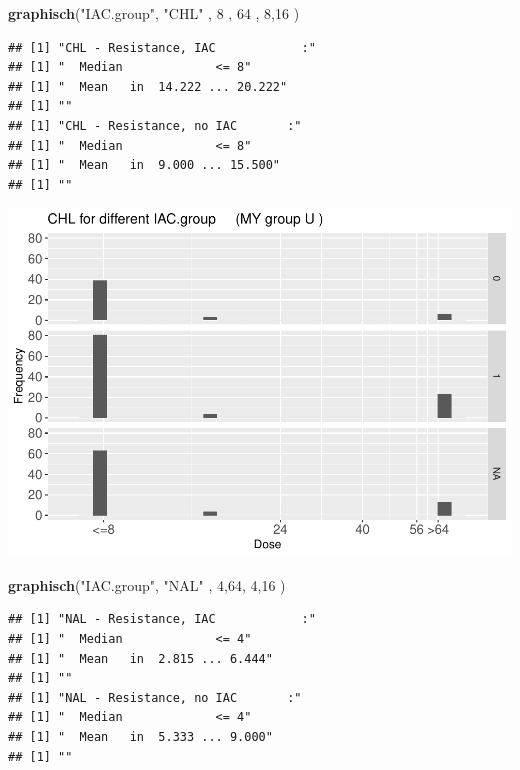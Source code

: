 \documentclass[
]{article}
\newenvironment{Shaded}{\begin{snugshade}}{\end{snugshade}}
\newcommand{\DecValTok}[1]{\textcolor[rgb]{0.00,0.00,0.81}{#1}}
\newcommand{\KeywordTok}[1]{\textcolor[rgb]{0.13,0.29,0.53}{\textbf{#1}}}
\newcommand{\NormalTok}[1]{#1}
\newcommand{\StringTok}[1]{\textcolor[rgb]{0.31,0.60,0.02}{#1}}
\begin{document}
\begin{Shaded}
\begin{Highlighting}[]
   \KeywordTok{graphisch}\NormalTok{(}\StringTok{"IAC.group"}\NormalTok{, }\StringTok{"CHL"}\NormalTok{ , }\DecValTok{8}\NormalTok{    ,  }\DecValTok{64}\NormalTok{   ,   }\DecValTok{8}\NormalTok{,}\DecValTok{16}\NormalTok{   ) }
\end{Highlighting}
\end{Shaded}

\begin{verbatim}
## [1] "CHL - Resistance, IAC            :"
## [1] "  Median             <= 8"
## [1] "  Mean   in  14.222 ... 20.222"
## [1] ""
## [1] "CHL - Resistance, no IAC       :"
## [1] "  Median             <= 8"
## [1] "  Mean   in  9.000 ... 15.500"
## [1] ""
\end{verbatim}

\includegraphics{Verteilungen_files/figure-latex/unnamed-chunk-13-1.pdf}

\begin{Shaded}
\begin{Highlighting}[]
   \KeywordTok{graphisch}\NormalTok{(}\StringTok{"IAC.group"}\NormalTok{, }\StringTok{"NAL"}\NormalTok{ , }\DecValTok{4}\NormalTok{,}\DecValTok{64}\NormalTok{,   }\DecValTok{4}\NormalTok{,}\DecValTok{16}\NormalTok{    ) }
\end{Highlighting}
\end{Shaded}

\begin{verbatim}
## [1] "NAL - Resistance, IAC            :"
## [1] "  Median             <= 4"
## [1] "  Mean   in  2.815 ... 6.444"
## [1] ""
## [1] "NAL - Resistance, no IAC       :"
## [1] "  Median             <= 4"
## [1] "  Mean   in  5.333 ... 9.000"
## [1] ""
\end{verbatim}
\end{document}
